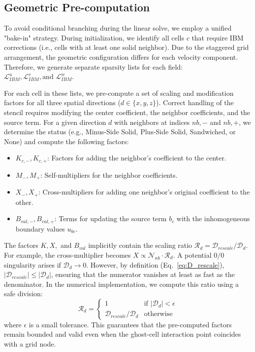 \documentclass[preprint,12pt]{elsarticle}
\begin{document}
\subsection{Geometric Pre-computation}
To avoid conditional branching during the linear solve, we employ a unified "bake-in" strategy. During initialization, we identify all cells $c$ that require IBM corrections (i.e., cells with at least one solid neighbor). Due to the staggered grid arrangement, the geometric configuration differs for each velocity component. Therefore, we generate separate sparsity lists for each field: $\mathcal{L}_{IBM}^u, \mathcal{L}_{IBM}^v, \text{and } \mathcal{L}_{IBM}^w$.

For each cell in these lists, we pre-compute a set of scaling and modification factors for all three spatial directions ($d \in \{x, y, z\}$). Correct handling of the stencil requires modifying the center coefficient, the neighbor coefficients, and the source term.
For a given direction $d$ with neighbors at indices $nb,-$ and $nb,+$, we determine the status (e.g., Minus-Side Solid, Plus-Side Solid, Sandwiched, or None) and compute the following factors:
\begin{itemize}
    \item $K_{c,-}, K_{c,+}$: Factors for adding the neighbor's coefficient to the center.
    \item $M_-, M_+$: Self-multipliers for the neighbor coefficients.
    \item $X_-, X_+$: Cross-multipliers for adding one neighbor's original coefficient to the other.
    \item $B_{val,-}, B_{val,+}$: Terms for updating the source term $b_c$ with the inhomogeneous boundary values $u_{bc}$.
\end{itemize}
The factors $K, X,$ and $B_{val}$ implicitly contain the scaling ratio $\mathcal{R}_d = \mathcal{D}_{rescale}/\mathcal{D}_d$. For example, the cross-multiplier becomes $X \propto \mathcal{N}_{nb} \cdot \mathcal{R}_d$. A potential $0/0$ singularity arises if $\mathcal{D}_d \to 0$. However, by definition (Eq.~\ref{eq:D_rescale}), $|\mathcal{D}_{rescale}| \le |\mathcal{D}_d|$, ensuring that the numerator vanishes at least as fast as the denominator. In the numerical implementation, we compute this ratio using a safe division:
\begin{equation}
    \mathcal{R}_d = \begin{cases} 
    1 & \text{if } |\mathcal{D}_d| < \epsilon \\
    \mathcal{D}_{rescale} / \mathcal{D}_d & \text{otherwise}
    \end{cases}
\end{equation}
where $\epsilon$ is a small tolerance. This guarantees that the pre-computed factors remain bounded and valid even when the ghost-cell interaction point coincides with a grid node.
\end{document}
